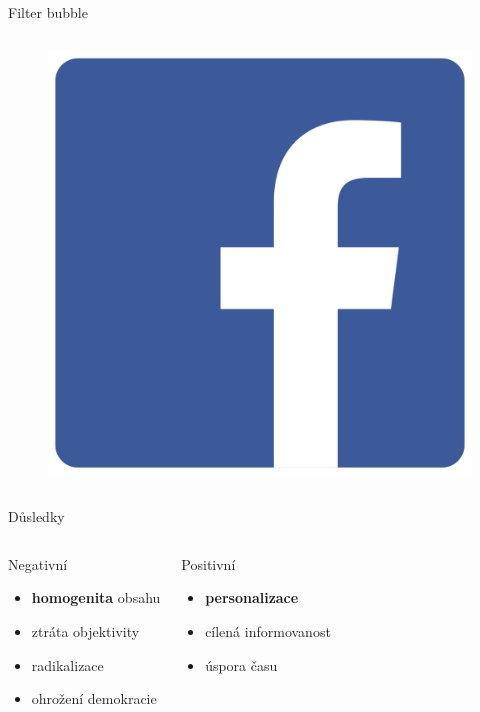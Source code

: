 \documentclass[notheorems,12pt]{beamer}
\begin{document}
\begin{frame}{Filter bubble}
\begin{columns}
\begin{figure}
            \includegraphics[scale=0.06]{./Pics/fb.png}
        \end{figure}
    \end{columns}
\end{frame}
\begin{frame}{Důsledky}
\begin{columns}
	\column{6cm}
	\begin{block}{Negativní}
		\begin{itemize}
			\item \textbf{homogenita} obsahu
            \item ztráta objektivity
            \item radikalizace
            \item ohrožení demokracie
		\end{itemize}
	\end{block}
	\column{6cm}
	\begin{block}{Positivní}
		\begin{itemize}
			\item \textbf{personalizace}
            \item cílená informovanost
            \item úspora času
		\end{itemize}
	\end{block}
\end{columns}
\end{frame}
\end{document}
